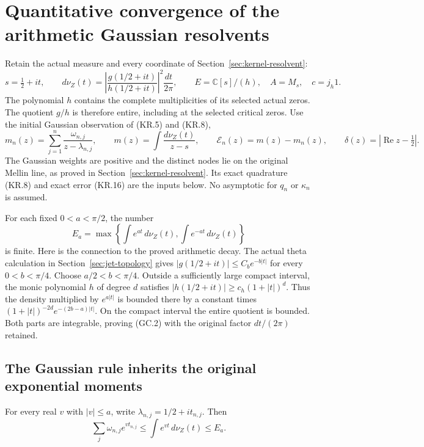 \section{Quantitative convergence of the arithmetic Gaussian resolvents}
\label{sec:gaussian-resolvent-convergence}

Retain the actual measure and every coordinate of
Section~\ref{sec:kernel-resolvent}:
\[
 s=\tfrac12+it,\qquad
 d\nu_Z(t)=\left|\frac{g(1/2+it)}{h(1/2+it)}\right|^2\frac{dt}{2\pi},
 \qquad E=\mathbb C[s]/(h),\quad A=M_s,\quad c=j_h1.
\]
The polynomial \(h\) contains the complete multiplicities of its
selected actual zeros.  The quotient \(g/h\) is therefore entire,
including at the selected critical zeros.  Use the initial Gaussian
observation of (KR.5) and (KR.8),
\[
 m_n(z)=\sum_{j=1}^n\frac{\omega_{n,j}}{z-\lambda_{n,j}},\qquad
 m(z)=\int\frac{d\nu_Z(t)}{z-s},\qquad
 \mathcal E_n(z)=m(z)-m_n(z),\qquad
 \delta(z)=|\operatorname{Re}z-\tfrac12|.
                                                        \tag{GC.1}
\]
The Gaussian weights are positive and the distinct nodes lie on the
original Mellin line, as proved in Section~\ref{sec:kernel-resolvent}.
Its exact quadrature (KR.8) and exact error (KR.16) are the inputs
below.  No asymptotic for \(q_n\) or \(\kappa_n\) is assumed.

For each fixed \(0<a<\pi/2\), the number
\[
 E_a=\max\left\{\int e^{at}\,d\nu_Z(t),
                       \int e^{-at}\,d\nu_Z(t)\right\}
                                                        \tag{GC.2}
\]
is finite.  Here is the connection to the proved arithmetic decay.
The actual theta calculation in Section~\ref{sec:jet-topology} gives
\(|g(1/2+it)|\leq C_b e^{-b|t|}\) for every \(0<b<\pi/4\).
Choose \(a/2<b<\pi/4\).  Outside a sufficiently large compact interval,
the monic polynomial \(h\) of degree \(d\) satisfies
\(|h(1/2+it)|\geq c_h(1+|t|)^d\).  Thus the density multiplied
by \(e^{a|t|}\) is bounded there by a constant times
\((1+|t|)^{-2d}e^{-(2b-a)|t|}\).  On the compact interval the entire
quotient is bounded.  Both parts are integrable, proving (GC.2) with
the original factor \(dt/(2\pi)\) retained.

\subsection{The Gaussian rule inherits the original exponential moments}

\begin{lemma}
For every real \(v\) with \(|v|\leq a\), write
\(\lambda_{n,j}=1/2+it_{n,j}\).  Then
\[
 \sum_j\omega_{n,j}e^{vt_{n,j}}
       \leq\int e^{vt}\,d\nu_Z(t)\leq E_a.              \tag{GC.3}
\]
\end{lemma}

